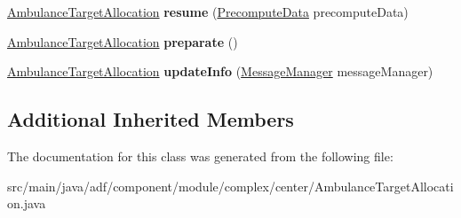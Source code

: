 \begin{DoxyCompactItemize}
\hyperlink{classadf_1_1component_1_1module_1_1complex_1_1center_1_1AmbulanceTargetAllocation}{Ambulance\+Target\+Allocation} {\bfseries resume} (\hyperlink{classadf_1_1agent_1_1precompute_1_1PrecomputeData}{Precompute\+Data} precompute\+Data)
\item 
\hypertarget{classadf_1_1component_1_1module_1_1complex_1_1center_1_1AmbulanceTargetAllocation_ac26b7e2b96ea7e6840e0c91975547940}{}\label{classadf_1_1component_1_1module_1_1complex_1_1center_1_1AmbulanceTargetAllocation_ac26b7e2b96ea7e6840e0c91975547940} 
\hyperlink{classadf_1_1component_1_1module_1_1complex_1_1center_1_1AmbulanceTargetAllocation}{Ambulance\+Target\+Allocation} {\bfseries preparate} ()
\item 
\hypertarget{classadf_1_1component_1_1module_1_1complex_1_1center_1_1AmbulanceTargetAllocation_a7e2b401a11a1021871b97390f89ad61f}{}\label{classadf_1_1component_1_1module_1_1complex_1_1center_1_1AmbulanceTargetAllocation_a7e2b401a11a1021871b97390f89ad61f} 
\hyperlink{classadf_1_1component_1_1module_1_1complex_1_1center_1_1AmbulanceTargetAllocation}{Ambulance\+Target\+Allocation} {\bfseries update\+Info} (\hyperlink{classadf_1_1agent_1_1communication_1_1MessageManager}{Message\+Manager} message\+Manager)
\end{DoxyCompactItemize}
\subsection*{Additional Inherited Members}


The documentation for this class was generated from the following file\+:\begin{DoxyCompactItemize}
\item 
src/main/java/adf/component/module/complex/center/Ambulance\+Target\+Allocation.\+java\end{DoxyCompactItemize}
